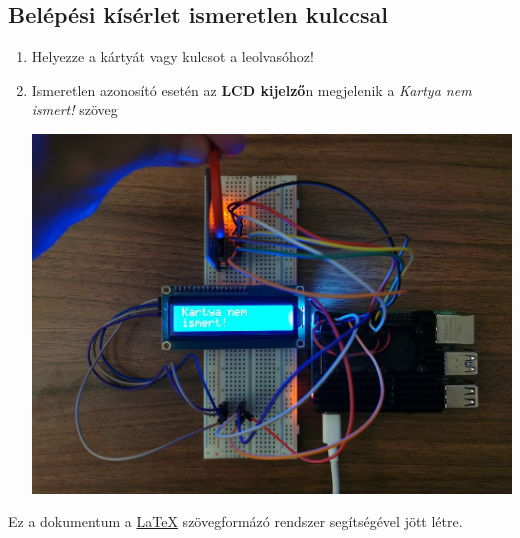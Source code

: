\documentclass[11pt, a4paper]{article}
\begin{document}
			\subsection{Belépési kísérlet ismeretlen kulccsal}
				\begin{enumerate}
					\justifying
					\item Helyezze a kártyát vagy kulcsot a leolvasóhoz!
					\item Ismeretlen azonosító esetén az \textbf{LCD kijelző}n megjelenik a \emph{Kartya nem ismert!} szöveg \\
					\begin{minipage}{\linewidth}
						\centering
						\includegraphics[width=0.7\linewidth]{img/7_nem_ismert}
						\label{fig:7nemismert}
					\end{minipage}
				\end{enumerate}
				\vfill
Ez a dokumentum a \color{blue} \href{https://www.latex-project.org/}{LaTeX} \color{black} szövegformázó rendszer segítségével jött létre.
\end{document}
